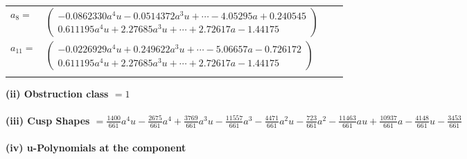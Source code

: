 \documentclass[1p]{elsarticle_modified}
\theoremstyle{definition}
\begin{document}
\begin{tabular}{m{7pt} m{180pt} m{7pt} m{180pt} }
\flushright $a_{8}=$&$\begin{pmatrix}-0.0862330 a^{4} u-0.0514372 a^{3} u+\cdots-4.05295 a+0.240545\\0.611195 a^{4} u+2.27685 a^{3} u+\cdots+2.72617 a-1.44175\end{pmatrix}$ \\
\flushright $a_{11}=$&$\begin{pmatrix}-0.0226929 a^{4} u+0.249622 a^{3} u+\cdots-5.06657 a-0.726172\\0.611195 a^{4} u+2.27685 a^{3} u+\cdots+2.72617 a-1.44175\end{pmatrix}$\\&\end{tabular}
\flushleft \textbf{(ii) Obstruction class $= 1$}\\~\\
\flushleft \textbf{(iii) Cusp Shapes $= \frac{1400}{661} a^4 u-\frac{2675}{661} a^4+\frac{3769}{661} a^3 u-\frac{11557}{661} a^3-\frac{4471}{661} a^2 u-\frac{723}{661} a^2-\frac{11463}{661} a u+\frac{10937}{661} a-\frac{4148}{661} u-\frac{3453}{661}$}\\~\\
\newpage\renewcommand{\arraystretch}{1}
\flushleft \textbf{(iv) u-Polynomials at the component}\newline \\
\end{document}
